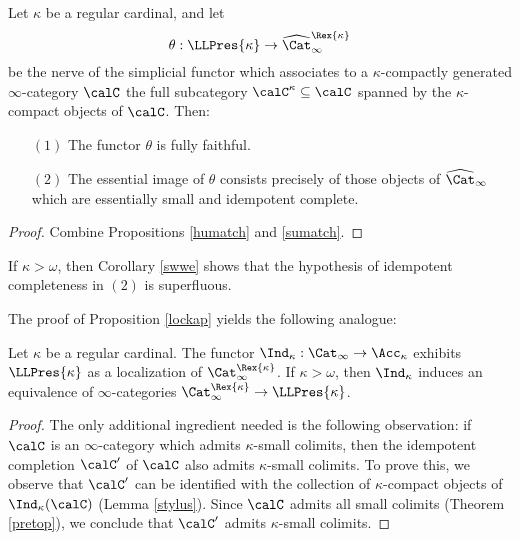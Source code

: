 \begin{proposition}\label{suchy}
Let $\kappa$ be a regular cardinal, and let
$$\theta: \LLPres{\kappa} \rightarrow \widehat{\Cat}_{\infty}^{\Rex{\kappa}}$$ be the nerve of the simplicial functor which associates to a $\kappa$-compactly generated $\infty$-category 
$\calC$ the full subcategory $\calC^{\kappa} \subseteq \calC$ spanned by the $\kappa$-compact objects of $\calC$. Then:
\begin{itemize}
\item[$(1)$] The functor $\theta$ is fully faithful. 
\item[$(2)$] The essential image of $\theta$ consists precisely of those objects of $\widehat{\Cat}_{\infty}$ which are essentially small and idempotent complete. 
\end{itemize}
\end{proposition}

\begin{proof}
Combine Propositions \ref{humatch} and \ref{sumatch}.
\end{proof}

\begin{remark}
If $\kappa > \omega$, then Corollary \ref{swwe} shows that the hypothesis of idempotent completeness in $(2)$ is superfluous.
\end{remark}

The proof of Proposition \ref{lockap} yields the following analogue:

\begin{proposition}\label{sumer}
Let $\kappa$ be a regular cardinal. The functor $\Ind_{\kappa}: \Cat_{\infty} \rightarrow \Acc_{\kappa}$ exhibits $\LLPres{\kappa}$ as a localization of $\Cat_{\infty}^{\Rex{\kappa}}$. 
If $\kappa > \omega$, then $\Ind_{\kappa}$ induces an equivalence of $\infty$-categories
$\Cat_{\infty}^{\Rex{\kappa}} \rightarrow \LLPres{\kappa}$.
\end{proposition}

\begin{proof}
The only additional ingredient needed is the following observation: if $\calC$ is an $\infty$-category which admits $\kappa$-small colimits, then the idempotent completion $\calC'$ of $\calC$ also admits $\kappa$-small colimits. To prove this, we observe that $\calC'$ can be identified with the collection of $\kappa$-compact objects of $\Ind_{\kappa}(\calC)$ (Lemma \ref{stylus}). Since $\calC$ admits all small colimits (Theorem \ref{pretop}), we conclude that $\calC'$ admits $\kappa$-small colimits.
\end{proof}

